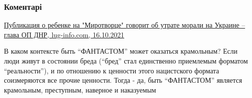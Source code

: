  
 
 
 
 
\subsubsection{Коментарі}
\label{sec:16_10_2021.fb.bobrov_gleb.1.savenkova_sajt_mirotvorec.cmt}

\begin{itemize} %
\href{https://lug-info.com/news/publikaciya-o-rebenke-na-mirotvorce-govorit-ob-utrate-morali-na-ukraine-glava-op-dnr}{%
Публикация о ребенке на "Миротворце" говорит об утрате морали на Украине – глава ОП ДНР, %
lug-info.com, 16.10.2021%
}



В каком контексте быть \enquote{ФАНТАСТОМ} может оказаться крамольным? Если люди живут
в состоянии бреда (\enquote{бред} стал единственно приемлемым форматом \enquote{реальности}), и
по отношению к ценности этого нацистского формата соизмеряются все прочие
ценности. Тогда - да, быть \enquote{ФАНТАСТОМ} является крамольным, преступным,
наверное и наказуемым

\end{itemize} %
